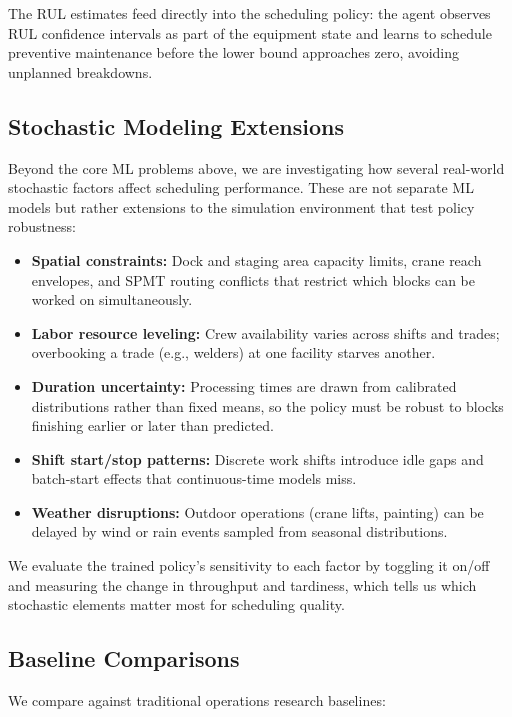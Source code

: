 \documentclass[12pt,letterpaper]{article}
\begin{document}
The RUL estimates feed directly into the scheduling policy: the agent observes RUL confidence intervals as part of the equipment state and learns to schedule preventive maintenance before the lower bound approaches zero, avoiding unplanned breakdowns.

\subsection{Stochastic Modeling Extensions}

Beyond the core ML problems above, we are investigating how several real-world stochastic factors affect scheduling performance. These are not separate ML models but rather extensions to the simulation environment that test policy robustness:

\begin{itemize}[leftmargin=1.5em]
  \item \textbf{Spatial constraints:} Dock and staging area capacity limits, crane reach envelopes, and SPMT routing conflicts that restrict which blocks can be worked on simultaneously.
  \item \textbf{Labor resource leveling:} Crew availability varies across shifts and trades; overbooking a trade (e.g., welders) at one facility starves another.
  \item \textbf{Duration uncertainty:} Processing times are drawn from calibrated distributions rather than fixed means, so the policy must be robust to blocks finishing earlier or later than predicted.
  \item \textbf{Shift start/stop patterns:} Discrete work shifts introduce idle gaps and batch-start effects that continuous-time models miss.
  \item \textbf{Weather disruptions:} Outdoor operations (crane lifts, painting) can be delayed by wind or rain events sampled from seasonal distributions.
\end{itemize}

We evaluate the trained policy's sensitivity to each factor by toggling it on/off and measuring the change in throughput and tardiness, which tells us which stochastic elements matter most for scheduling quality.

\subsection{Baseline Comparisons}

We compare against traditional operations research baselines:
\end{document}

